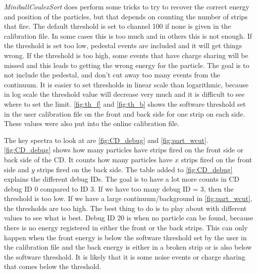 \documentclass[twoside,english]{uiofysmaster/uiofysmaster}
\let\orgautoref\autoref
\renewcommand{\autoref}
        {%
		 \def\sectionautorefname{Section}%
		 \def\subsectionautorefname{Section}%
		 \def\subsubsectionautorefname{Section}%
		 \def\chapterautorefname{Chapter}%
          \orgautoref}
\begin{document}
\textsl{MiniballCoulexSort} does perform some tricks to try to recover the correct energy and position of the particles, but that depends on counting the number of strips that fire. 
The default threshold is set to channel 100 if none is given in the calibration file.
In some cases this is too much and in others this is not enough. 
If the threshold is set too low, pedestal events are included and it will get things wrong. 
If the threshold is too high, some events that have charge sharing will be missed and this leads to getting the wrong energy for the particle.
The goal is to not include the pedestal, and don't cut away too many events from the continuum.
It is easier to set thresholds in linear scale than logarithmic, because in log scale the threshold value will decrease very much and it is difficult to see where to set the limit. 
\autoref{fig:th_f} and \autoref{fig:th_b} shows the software threshold set in the user calibration file on the front and back side for one strip on each side.
These values were also put into the online calibration file.





The key spectra to look at are \autoref{fig:CD_debug} and \autoref{fig:part_wcut}. 
\autoref{fig:CD_debug} shows how many particles have strips fired on the front side or back side of the CD. 
It counts how many particles have $x$ strips fired on the front side and $y$ strips fired on the back side. 
The table added to \autoref{fig:CD_debug} explains the different debug IDs. 
The goal is to have a lot more counts in CD debug ID 0 compared to ID 3.
If we have too many debug ID = 3, then the threshold is too low. 
If we have a large continuum/background in \autoref{fig:part_wcut}, the thresholds are too high. 
The best thing to do is to play about with different values to see what is best.
Debug ID 20 is when no particle can be found, because there is no energy registered in either the front or the back strips. 
This can only happen when the front energy is below the software threshold set by the user in the calibration file and the back energy is either in a broken strip or is also below the software threshold. 
It is likely that it is some noise events or charge sharing that comes below the threshold. 
\end{document}
